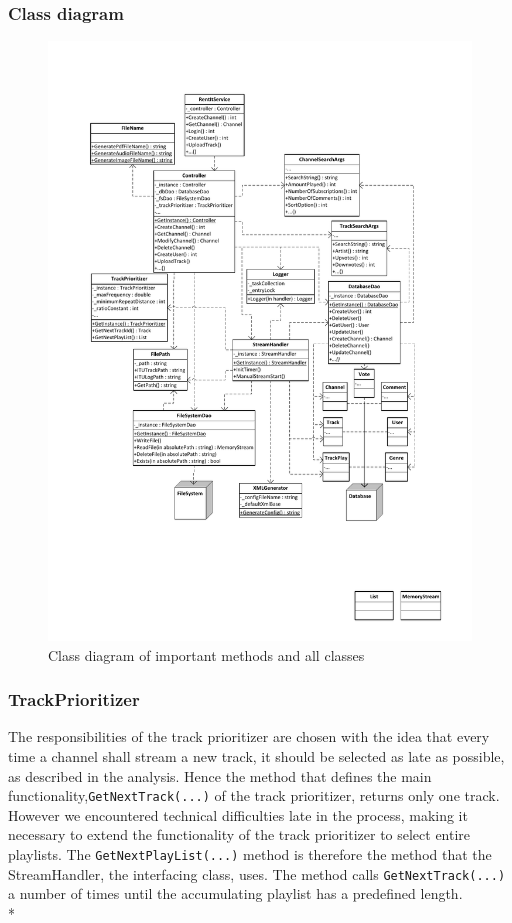 \documentclass[a4paper,11pt,report]{article}
\begin{document}
\subsubsection{Class diagram}
\begin{figure}[H]
  \centering
\includegraphics[width=400pt,keepaspectratio=true,trim=80pt 170pt 80pt 50pt]{./ClassDiagramv2.pdf}
\caption{Class diagram of important methods and all classes}
\end{figure}

\subsubsection{TrackPrioritizer} \label{sec:tp}
The responsibilities of the track prioritizer are chosen with the idea that every time a channel shall stream a new track, it should be selected as late as possible, as described in the analysis. Hence the method that defines the main functionality,\texttt{GetNextTrack(...)} of the track prioritizer, returns only one track. However we encountered technical difficulties late in the process, making it necessary to extend the functionality of the track prioritizer to select entire playlists. The \texttt{GetNextPlayList(...)} method is therefore the method that the StreamHandler, the interfacing class, uses. The method calls \texttt{GetNextTrack(...)} a number of times until the accumulating playlist has a predefined length. \\*
\end{document}
